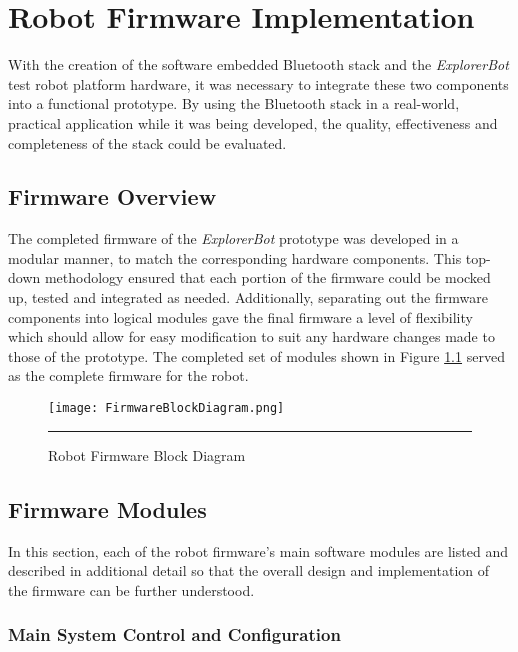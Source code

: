 \chapter{Robot Firmware Implementation}
\label{chp:robotfwimp}

With the creation of the software embedded Bluetooth stack and the \textit{ExplorerBot} test robot platform hardware, it was necessary to integrate these two components into a functional prototype. By using the Bluetooth stack in a real-world, practical application while it was being developed, the quality, effectiveness and completeness of the stack could be evaluated.

\section{Firmware Overview}

The completed firmware of the \textit{ExplorerBot} prototype was developed in a modular manner, to match the corresponding hardware components. This top-down methodology ensured that each portion of the firmware could be mocked up, tested and integrated as needed. Additionally, separating out the firmware components into logical modules gave the final firmware a level of flexibility which should allow for easy modification to suit any hardware changes made to those of the prototype. The completed set of modules shown in Figure \ref{fig:robotblockfw} served as the complete firmware for the robot.

\begin{figure}[H]
	\vspace{1em}
	\centering
		\texttt{[image: FirmwareBlockDiagram.png]}
	\rule{35em}{0.5pt}
	\caption[Firmware Block Diagram]{Robot Firmware Block Diagram}
	\label{fig:robotblockfw}
\end{figure}

\section{Firmware Modules}

In this section, each of the robot firmware's main software modules are listed and described in additional detail so that the overall design and implementation of the firmware can be further understood.

\FloatBarrier
\subsection{Main System Control and Configuration}

